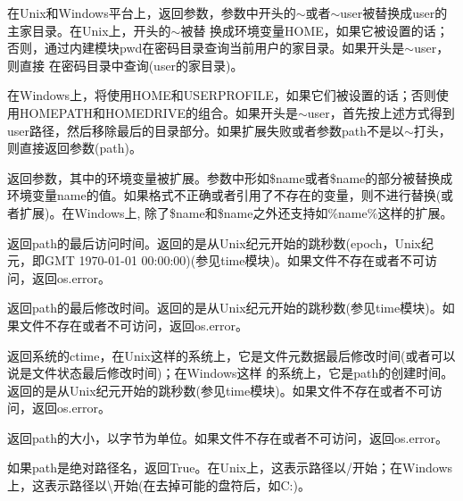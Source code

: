 \noindent{\color{red}{os.path.expanduser(path):}}
\par{在Unix和Windows平台上，返回参数，参数中开头的$\sim$或者$\sim$user被替换成user的主家目录。在Unix上，开头的$\sim$被替
  换成环境变量HOME，如果它被设置的话；否则，通过内建模块pwd在密码目录查询当前用户的家目录。如果开头是$\sim$user，则直接
  在密码目录中查询(user的家目录)。}
\par{在Windows上，将使用HOME和USERPROFILE，如果它们被设置的话；否则使用HOMEPATH和HOMEDRIVE的组合。如果开头是$\sim$user，首先按上述方式得到user路径，然后移除最后的目录部分。如果扩展失败或者参数path不是以$\sim$打头，则直接返回参数(path)。
}\\

\noindent{\color{red}{os.path.expandvars(path):}}
\par{返回参数，其中的环境变量被扩展。参数中形如\$name或者\${name}的部分被替换成环境变量name的值。如果格式不正确或者引用了不存在的变量，则不进行替换(或者扩展)。在Windows上, 除了\$name和\${name}之外还支持如\%name\%这样的扩展。
}\\

\noindent{\color{red}{os.path.getatime(path):}}
\par{返回path的最后访问时间。返回的是从Unix纪元开始的跳秒数(epoch，Unix纪元，即GMT 1970-01-01 00:00:00)(参见time模块)。如果文件不存在或者不可访问，返回os.error。}\\

\noindent{\color{red}{os.path.getmtime(path):}}
\par{返回path的最后修改时间。返回的是从Unix纪元开始的跳秒数(参见time模块)。如果文件不存在或者不可访问，返回os.error。}\\

\noindent{\color{red}{os.path.getctime(path):}}
\par{返回系统的ctime，在Unix这样的系统上，它是文件元数据最后修改时间(或者可以说是文件状态最后修改时间)；在Windows这样  的系统上，它是path的创建时间。返回的是从Unix纪元开始的跳秒数(参见time模块)。如果文件不存在或者不可访问，返回os.error。}\\

\noindent{\color{red}{os.path.getsize(path):}}
\par{返回path的大小，以字节为单位。如果文件不存在或者不可访问，返回os.error。}\\

\noindent{\color{red}{os.path.isabs(path):}}
\par{如果path是绝对路径名，返回True。在Unix上，这表示路径以/开始；在Windows上，这表示路径以\textbackslash{}开始(在去掉可能的盘符后，如C:)。}\\

